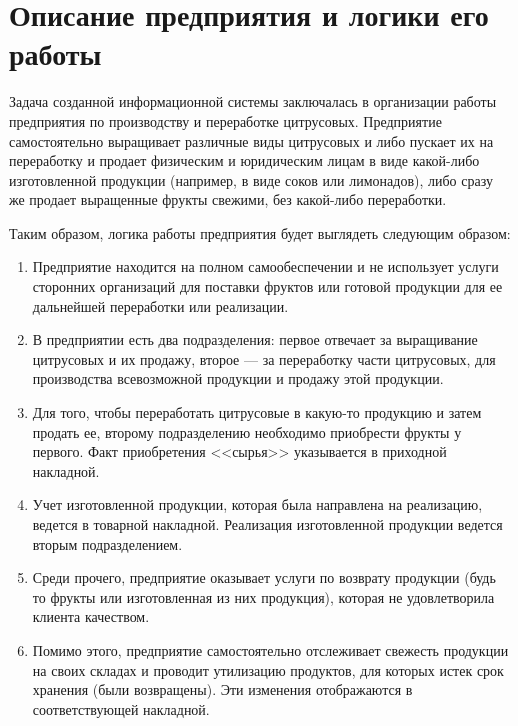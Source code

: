\documentclass[12pt,a4paper]{article}
\begin{document}
\section{Описание предприятия и логики его работы}
Задача созданной информационной системы заключалась в организации работы предприятия по производству и переработке цитрусовых. Предприятие самостоятельно выращивает различные виды цитрусовых и либо пускает их на переработку и продает физическим и юридическим лицам в виде какой-либо изготовленной продукции (например, в виде соков или лимонадов), либо сразу же продает выращенные фрукты свежими, без какой-либо переработки.

Таким образом, логика работы предприятия будет выглядеть следующим образом:

\begin{enumerate}
    \item Предприятие находится на полном самообеспечении и не использует услуги сторонних организаций для поставки фруктов или готовой продукции для ее дальнейшей переработки или реализации.

    \item В предприятии есть два подразделения: первое отвечает за выращивание цитрусовых и их продажу, второе --- за переработку части цитрусовых, для производства всевозможной продукции и продажу этой продукции.

    \item Для того, чтобы переработать цитрусовые в какую-то продукцию и затем продать ее, второму подразделению необходимо приобрести фрукты у первого. Факт приобретения <<сырья>> указывается в приходной накладной.

    \item Учет изготовленной продукции, которая была направлена на реализацию, ведется в товарной накладной. Реализация изготовленной продукции ведется вторым подразделением.

    \item Среди прочего, предприятие оказывает услуги по возврату продукции (будь то фрукты или изготовленная из них продукция), которая не удовлетворила клиента качеством.

    \item Помимо этого, предприятие самостоятельно отслеживает свежесть продукции на своих складах и проводит утилизацию продуктов, для которых истек срок хранения (были возвращены). Эти изменения отображаются в соответствующей накладной.
\end{enumerate}
\end{document}
